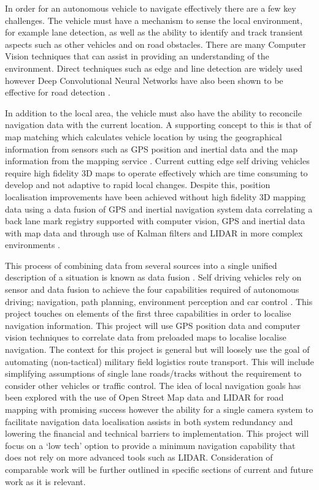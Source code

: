 \documentclass[]{aiaa-tc}%
\begin{document}
In order for an autonomous vehicle to navigate effectively there are a few key challenges. The vehicle must have a mechanism to sense the local environment, for example lane detection, as well as the ability to identify and track transient aspects such as other vehicles and on road obstacles. There are many Computer Vision techniques that can assist in providing an understanding of the environment. Direct techniques such as edge and line detection are widely used however Deep Convolutional Neural Networks have also been shown to be effective for road detection \citep{deepRoadSegmentation}.

In addition to the local area, the vehicle must also have the ability to reconcile navigation data with the current location. A supporting concept to this is that of map matching which calculates vehicle location by using the geographical information from sensors such as GPS position and inertial data and the map information from the mapping service \citep{keyTechSelfDriving}. Current cutting edge self driving vehicles require high fidelity 3D maps to operate effectively which are time consuming to develop and not adaptive to rapid local changes. Despite this, position localisation improvements have been achieved without high fidelity 3D mapping data using a data fusion of GPS and inertial navigation system data \citep{gpsInsFusion} correlating a back lane mark registry supported with computer vision, GPS and inertial data with map data \citep{lowCostSensorNav} and through use of Kalman filters and LIDAR in more complex environments \citep{robotLIDARSLAM}.

This process of combining data from several sources into a single unified description of a situation is known as data fusion \citep{gpsInsFusion}. Self driving vehicles rely on sensor and data fusion to achieve the four capabilities required of autonomous driving; navigation, path planning, environment perception and car control \citep{keyTechSelfDriving}. This project touches on elements of the first three capabilities in order to localise navigation information. This project will use GPS position data and computer vision techniques to correlate data from preloaded maps to localise localise navigation. The context for this project is general but will loosely use the goal of automating (non-tactical) military field logistics route transport. This will include simplifying assumptions of single lane roads/tracks without the requirement to consider other vehicles or traffic control. The idea of local navigation goals has been explored with the use of Open Street Map data and LIDAR for road mapping with promising success \citep{mitLocalNavDriving} however the ability for a single camera system to facilitate navigation data localisation assists in both system redundancy and lowering the financial and technical barriers to implementation. This project will focus on a `low tech' option to provide a minimum navigation capability that does not rely on more advanced tools such as LIDAR. Consideration of comparable work will be further outlined in specific sections of current and future work as it is relevant.
\end{document}
